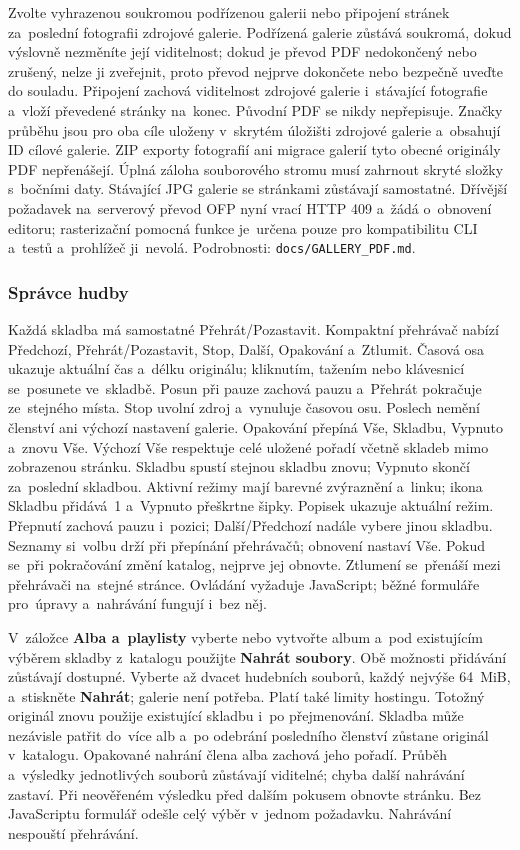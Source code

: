 \documentclass[11pt,a4paper]{article}
\newcommand{\ui}[1]{\textbf{#1}}
\newcommand{\codeword}[1]{\nolinkurl{#1}}
\begin{document}
Zvolte vyhrazenou soukromou podřízenou galerii nebo připojení stránek
za~poslední fotografii zdrojové galerie. Podřízená galerie zůstává soukromá,
dokud výslovně nezměníte její viditelnost; dokud je převod PDF nedokončený nebo
zrušený, nelze ji zveřejnit, proto převod nejprve dokončete nebo bezpečně uveďte
do souladu. Připojení zachová viditelnost zdrojové galerie i~stávající
fotografie a~vloží převedené stránky na~konec. Původní PDF se nikdy nepřepisuje.
Značky průběhu jsou pro oba cíle uloženy v~skrytém úložišti zdrojové galerie
a~obsahují ID cílové galerie. ZIP exporty fotografií ani migrace galerií tyto
obecné originály PDF nepřenášejí. Úplná záloha souborového stromu musí zahrnout
skryté složky s~bočními daty. Stávající JPG galerie se stránkami zůstávají
samostatné. Dřívější požadavek na~serverový převod OFP nyní vrací HTTP 409
a~žádá o~obnovení editoru; rasterizační pomocná funkce je~určena pouze pro
kompatibilitu CLI a~testů a~prohlížeč ji~nevolá. Podrobnosti:
\codeword{docs/GALLERY\_PDF.md}.

\subsubsection{Správce hudby}

Každá skladba má samostatné Přehrát/Pozastavit. Kompaktní přehrávač nabízí
Předchozí, Přehrát/Pozastavit, Stop, Další, Opakování a~Ztlumit.
Časová osa ukazuje aktuální čas a~délku originálu; kliknutím, tažením nebo
klávesnicí se~posunete ve~skladbě. Posun při pauze zachová pauzu a~Přehrát
pokračuje ze~stejného místa. Stop uvolní zdroj a~vynuluje časovou osu. Poslech
nemění členství ani výchozí nastavení galerie. Opakování přepíná Vše, Skladbu,
Vypnuto a~znovu Vše. Výchozí Vše respektuje celé uložené pořadí včetně skladeb
mimo zobrazenou stránku. Skladbu spustí stejnou skladbu znovu; Vypnuto skončí
za~poslední skladbou. Aktivní režimy mají barevné zvýraznění a~linku; ikona
Skladbu přidává~1 a~Vypnuto přeškrtne šipky. Popisek ukazuje aktuální režim.
Přepnutí zachová pauzu i~pozici; Další/Předchozí nadále vybere jinou skladbu.
Seznamy si~volbu drží při přepínání přehrávačů; obnovení nastaví Vše. Pokud se~při
pokračování změní katalog, nejprve jej obnovte. Ztlumení se~přenáší mezi
přehrávači na~stejné stránce. Ovládání vyžaduje JavaScript; běžné formuláře
pro~úpravy a~nahrávání fungují i~bez něj.

V~záložce \ui{Alba a~playlisty} vyberte nebo vytvořte album a~pod existujícím
výběrem skladby z~katalogu použijte \ui{Nahrát soubory}. Obě možnosti
přidávání zůstávají dostupné. Vyberte až dvacet hudebních souborů, každý
nejvýše 64~MiB, a~stiskněte \ui{Nahrát}; galerie není potřeba. Platí také
limity hostingu. Totožný originál znovu použije existující skladbu i~po
přejmenování. Skladba může nezávisle patřit do~více alb a~po odebrání
posledního členství zůstane originál v~katalogu. Opakované nahrání člena alba
zachová jeho pořadí. Průběh a~výsledky jednotlivých souborů zůstávají viditelné;
chyba další nahrávání zastaví. Při neověřeném výsledku před dalším pokusem
obnovte stránku. Bez JavaScriptu formulář odešle celý výběr v~jednom požadavku.
Nahrávání nespouští přehrávání.
\end{document}
